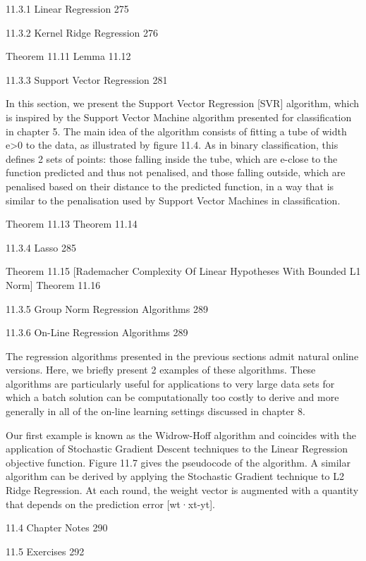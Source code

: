 11.3.1 Linear Regression 275



11.3.2 Kernel Ridge Regression 276

Theorem 11.11
Lemma 11.12

11.3.3 Support Vector Regression 281

In this section, we present the Support Vector Regression [SVR] algorithm, which is inspired by the Support Vector Machine algorithm presented for classification in chapter 5. The main idea of the algorithm consists of fitting a tube of width e>0 to the data, as illustrated by figure 11.4. As in binary classification, this defines 2 sets of points: those falling inside the tube, which are e-close to the function predicted and thus not penalised, and those falling outside, which are penalised based on their distance to the predicted function, in a way that is similar to the penalisation used by Support Vector Machines in classification.

Theorem 11.13
Theorem 11.14

11.3.4 Lasso 285

Theorem 11.15 [Rademacher Complexity Of Linear Hypotheses With Bounded L1 Norm]
Theorem 11.16

11.3.5 Group Norm Regression Algorithms 289



11.3.6 On-Line Regression Algorithms 289

The regression algorithms presented in the previous sections admit natural online versions. Here, we briefly present 2 examples of these algorithms. These algorithms are particularly useful for applications to very large data sets for which a batch solution can be computationally too costly to derive and more generally in all of the on-line learning settings discussed in chapter 8.

Our first example is known as the Widrow-Hoff algorithm and coincides with the application of Stochastic Gradient Descent techniques to the Linear Regression objective function. Figure 11.7 gives the pseudocode of the algorithm. A similar algorithm can be derived by applying the Stochastic Gradient technique to L2 Ridge Regression. At each round, the weight vector is augmented with a quantity that depends on the prediction error [wt·xt-yt].

11.4 Chapter Notes 290



11.5 Exercises 292



